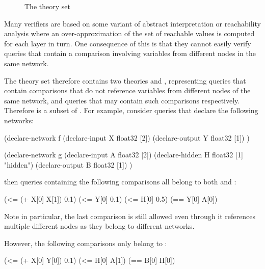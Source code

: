 \begin{figure}[h]
\centering
{}
\caption{The \multiComparison{} theory set}
\label{fig:multi-node-comparisons-theory-set}
\end{figure}

Many verifiers are based on some variant of abstract interpretation or reachability analysis where an over-approximation of the set of reachable values is computed for each layer in turn.
One consequence of this is that they cannot easily verify queries that contain a comparison involving variables from different nodes in the same network.

The \multiComparison{} theory set therefore contains two theories \snc{} and \mnc{}, representing queries that contain comparisons that do not reference variables from different nodes of the same network, and queries that may contain such comparisons respectively. Therefore \snc{} is a subset of \mnc{}. For example, consider queries that declare the following networks:

\begin{code}[style=lbnf]
(declare-network f
    (declare-input  X float32 [2])
    (declare-output Y float32 [1])
)

(declare-network g
    (declare-input  A float32 [2])
    (declare-hidden H float32 [1] "hidden")
    (declare-output B float32 [1])
)
\end{code}

\noindent then queries containing the following comparisons all belong to both \snc{} and \mnc{}:

\begin{code}[style=lbnf]
(<= (+ X[0] X[1]) 0.1)
(<= Y[0] 0.1)
(<= H[0] 0.5)
(== Y[0] A[0])
\end{code}

\noindent Note in particular, the last comparison is still allowed even through it references multiple different nodes as they belong to different networks. 

However, the following comparisons only belong to \mnc{}:

\begin{code}[style=lbnf]
(<= (+ X[0] Y[0]) 0.1)
(<= H[0] A[1])
(== B[0] H[0])
\end{code}

